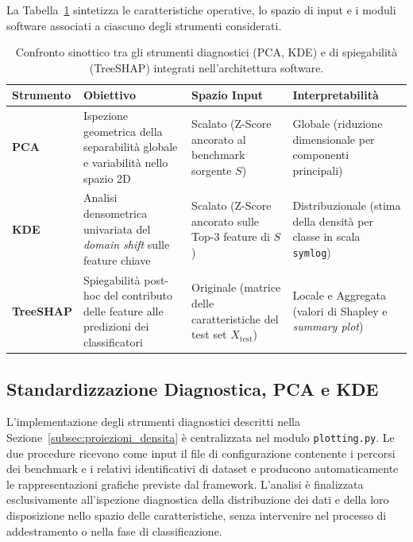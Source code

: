 La Tabella~\ref{tab:confronto_strumenti_diagnostici} sintetizza le caratteristiche operative, lo spazio di input e i moduli software associati a ciascuno degli strumenti considerati.

\begin{table}[H]
    \centering
    \small
    \caption{Confronto sinottico tra gli strumenti diagnostici (PCA, KDE) e di spiegabilità (TreeSHAP) integrati nell'architettura software.}
    \label{tab:confronto_strumenti_diagnostici}
    \begin{tabularx}{\textwidth}{l >{\raggedright\arraybackslash}X >{\raggedright\arraybackslash}X >{\raggedright\arraybackslash}X}
        \toprule
        \textbf{Strumento} & \textbf{Obiettivo} & \textbf{Spazio Input} & \textbf{Interpretabilità} \\
        \midrule
        \textbf{PCA} & Ispezione geometrica della separabilità globale e variabilità nello spazio 2D & Scalato (Z-Score ancorato al benchmark sorgente $S$) & Globale (riduzione dimensionale per componenti principali) \\
        \addlinespace
        \textbf{KDE} & Analisi densometrica univariata del \textit{domain shift} sulle feature chiave & Scalato (Z-Score ancorato sulle Top-3 feature di $S$) & Distribuzionale (stima della densità per classe in scala \texttt{symlog}) \\
        \addlinespace
        \textbf{TreeSHAP} & Spiegabilità post-hoc del contributo delle feature alle predizioni dei classificatori & Originale (matrice delle caratteristiche del test set $X_{\mathrm{test}}$) & Locale e Aggregata (valori di Shapley e \textit{summary plot}) \\
        \bottomrule
    \end{tabularx}
\end{table}


\subsection{Standardizzazione Diagnostica, PCA e KDE}
\label{subsec:implementazione_pca_kde}

L'implementazione degli strumenti diagnostici descritti nella Sezione~\ref{subsec:proiezioni_densita} è centralizzata nel modulo \texttt{plotting.py}. 
Le due procedure ricevono come input il file di configurazione contenente i percorsi dei benchmark e i relativi identificativi di dataset e producono automaticamente le rappresentazioni grafiche previste dal framework. 
L'analisi è finalizzata esclusivamente all'ispezione diagnostica della distribuzione dei dati e della loro disposizione nello spazio delle caratteristiche, senza intervenire nel processo di addestramento o nella fase di classificazione.

